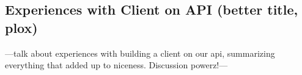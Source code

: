 \subsection{Experiences with Client on API (better title, plox)}

---talk about experiences with building a client on our api, summarizing everything that added up to niceness. Discussion powerz!---